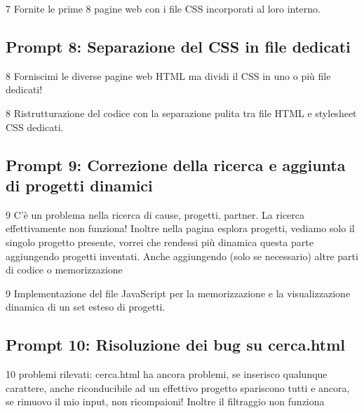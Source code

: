 \documentclass[11pt,a4paper]{article}
\begin{document}
    \begin{respbox}{7}
        Fornite le prime 8 pagine web con i file CSS incorporati al loro interno.
    \end{respbox}

    \subsection{Prompt 8: Separazione del CSS in file dedicati}
    \label{prompt:8}
    \begin{promptbox}{8}
        Forniscimi le diverse pagine web HTML ma dividi il CSS in uno o più file dedicati!
    \end{promptbox}

    \begin{respbox}{8}
        Ristrutturazione del codice con la separazione pulita tra file HTML e stylesheet CSS dedicati.
    \end{respbox}

    \subsection{Prompt 9: Correzione della ricerca e aggiunta di progetti dinamici}
    \label{prompt:9}
    \begin{promptbox}{9}
        C'è un problema nella ricerca di cause, progetti, partner. La ricerca effettivamente non funziona! Inoltre nella pagina esplora progetti, vediamo solo il singolo progetto presente, vorrei che rendessi più dinamica questa parte aggiungendo progetti inventati. Anche aggiungendo (solo se necessario) altre parti di codice o memorizzazione
    \end{promptbox}

    \begin{respbox}{9}
        Implementazione del file JavaScript per la memorizzazione e la visualizzazione dinamica di un set esteso di progetti.
    \end{respbox}

    \subsection{Prompt 10: Risoluzione dei bug su cerca.html}
    \label{prompt:10}
    \begin{promptbox}{10}
        problemi rilevati: cerca.html ha ancora problemi, se inserisco qualunque carattere, anche riconducibile ad un effettivo progetto spariscono tutti e ancora, se rimuovo il mio input, non ricompaioni! Inoltre il filtraggio non funziona
    \end{promptbox}
\end{document}
